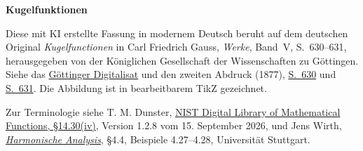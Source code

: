 \clearpage
{}
\begin{center}\textbf{Kugelfunktionen}\end{center}
\noindent Diese mit KI erstellte Fassung in modernem Deutsch beruht auf dem deutschen Original \textit{Kugelfunctionen} in Carl Friedrich Gauss, \textit{Werke}, Band~V, S.~630--631, herausgegeben von der Königlichen Gesellschaft der Wissenschaften zu Göttingen. Siehe das \href{https://gdz.sub.uni-goettingen.de/id/PPN236006339}{Göttinger Digitalisat} und den zweiten Abdruck (1877), \href{https://archive.org/download/Werkecarlf05gausrich/page/n641}{S.~630} und \href{https://archive.org/download/Werkecarlf05gausrich/page/n642}{S.~631}. Die Abbildung ist in bearbeitbarem TikZ gezeichnet.
\par\smallskip\noindent Zur Terminologie siehe T. M. Dunster, \href{https://dlmf.nist.gov/14.30.iv}{NIST Digital Library of Mathematical Functions, §14.30(iv)}, Version 1.2.8 vom 15. September 2026, und Jens Wirth, \href{https://pnp.mathematik.uni-stuttgart.de/iadm/Wirth/Skripte/HarmonischeAnalysis/}{\textit{Harmonische Analysis}}, §4.4, Beispiele 4.27--4.28, Universität Stuttgart.
\clearpage
